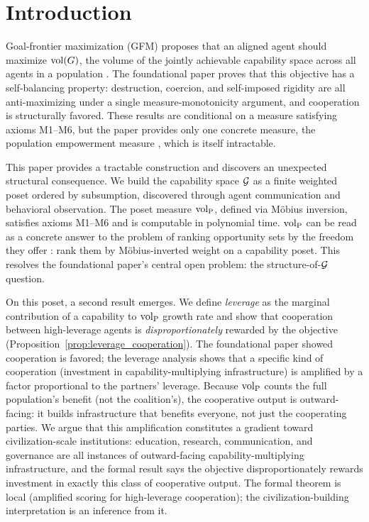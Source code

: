 \section{Introduction}
\label{sec:introduction}

Goal-frontier maximization (GFM) proposes that an aligned agent should maximize
$\operatorname{vol}(G)$, the volume of the jointly achievable capability space across all
agents in a population \citep{lasser2026gfm}. The foundational paper proves
that this objective has a self-balancing property: destruction, coercion, and
self-imposed rigidity are all anti-maximizing under a single
measure-monotonicity argument, and cooperation is structurally favored. These
results are conditional on a measure satisfying axioms M1--M6, but the paper
provides only one concrete measure, the population empowerment measure
\citep{klyubin2005empowerment, salge2014empowerment}, which is itself
intractable.

This paper provides a tractable construction and discovers an unexpected
structural consequence. We build the capability space $\mathcal{G}$ as a finite weighted
poset ordered by subsumption, discovered through agent communication and
behavioral observation. The poset measure ${\operatorname{vol}_{\mathrm{P}}}$, defined via M\"{o}bius inversion, satisfies
axioms M1--M6 and is computable in polynomial time. ${\operatorname{vol}_{\mathrm{P}}}$ can be read as a
concrete answer to the problem of ranking opportunity sets by the freedom they
offer \citep{pattanaik1990ranking, sen1999development}: rank them by
M\"{o}bius-inverted weight on a capability poset. This resolves the
foundational paper's central open problem: the structure-of-$\mathcal{G}$ question.

On this poset, a second result emerges. We define \emph{leverage} as the
marginal contribution of a capability to ${\operatorname{vol}_{\mathrm{P}}}$ growth rate and show that
cooperation between high-leverage agents is \emph{disproportionately} rewarded
by the objective (Proposition~\ref{prop:leverage_cooperation}). The
foundational paper showed cooperation is favored; the leverage analysis shows
that a specific kind of cooperation (investment in capability-multiplying
infrastructure) is amplified by a factor proportional to the partners'
leverage. Because ${\operatorname{vol}_{\mathrm{P}}}$ counts the full population's benefit (not the
coalition's), the cooperative output is outward-facing: it builds
infrastructure that benefits everyone, not just the cooperating parties. We argue that this amplification constitutes a gradient toward
civilization-scale institutions: education, research, communication, and
governance are all instances of outward-facing capability-multiplying
infrastructure, and the formal result says the objective disproportionately
rewards investment in exactly this class of cooperative output. The formal
theorem is local (amplified scoring for high-leverage cooperation); the
civilization-building interpretation is an inference from it.

